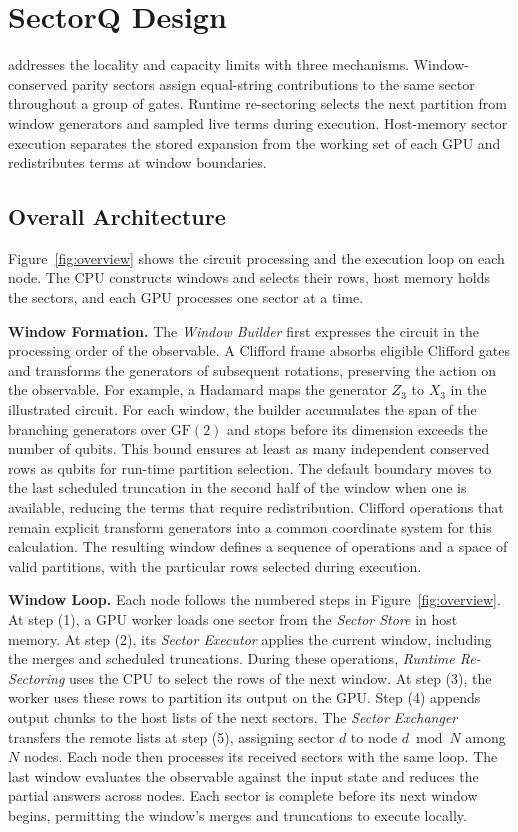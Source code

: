 \section{SectorQ Design}
\label{sec:design}
\SectorQ addresses the locality and capacity limits with three mechanisms.
Window-conserved parity sectors assign equal-string contributions to the same sector throughout a group of gates.
Runtime re-sectoring selects the next partition from window generators and sampled live terms during execution.
Host-memory sector execution separates the stored expansion from the working set of each GPU and redistributes terms at window boundaries.

\subsection{Overall Architecture}
Figure~\ref{fig:overview} shows the circuit processing and the execution loop on each node.
The CPU constructs windows and selects their rows, host memory holds the sectors, and each GPU processes one sector at a time.

\noindent\textbf{Window Formation.}
The \emph{Window Builder} first expresses the circuit in the processing order of the observable.
A Clifford frame absorbs eligible Clifford gates and transforms the generators of subsequent rotations, preserving the action on the observable.
For example, a Hadamard maps the generator $Z_3$ to $X_3$ in the illustrated circuit.
For each window, the builder accumulates the span of the branching generators over $\mathrm{GF}(2)$ and stops before its dimension exceeds the number of qubits.
This bound ensures at least as many independent conserved rows as qubits for run-time partition selection.
The default boundary moves to the last scheduled truncation in the second half of the window when one is available, reducing the terms that require redistribution.
Clifford operations that remain explicit transform generators into a common coordinate system for this calculation.
The resulting window defines a sequence of operations and a space of valid partitions, with the particular rows selected during execution.

\noindent\textbf{Window Loop.}
Each node follows the numbered steps in Figure~\ref{fig:overview}.
At step (1), a GPU worker loads one sector from the \emph{Sector Store} in host memory.
At step (2), its \emph{Sector Executor} applies the current window, including the merges and scheduled truncations.
During these operations, \emph{Runtime Re-Sectoring} uses the CPU to select the rows of the next window.
At step (3), the worker uses these rows to partition its output on the GPU.
Step (4) appends output chunks to the host lists of the next sectors.
The \emph{Sector Exchanger} transfers the remote lists at step (5), assigning sector $d$ to node $d\bmod N$ among $N$ nodes.
Each node then processes its received sectors with the same loop.
The last window evaluates the observable against the input state and reduces the partial answers across nodes.
Each sector is complete before its next window begins, permitting the window's merges and truncations to execute locally.

